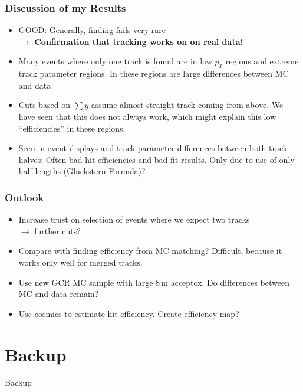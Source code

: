 \documentclass[18pt]{beamer}
\begin{document}
\begin{frame}
  \frametitle{Discussion of my Results}
  \begin{itemize}
  \item GOOD: Generally, finding fails very rare\\
    $\rightarrow$  \textbf{Confirmation that tracking works on on real data!}
  \item Many events where only one track is found are in low $p_T$ regions and extreme track parameter regions.
    In these regions are large differences between MC and data
  \item Cuts based on $\sum y$ assume almost straight track coming from above. We have seen that this does not always work, which might explain this low ``efficiencies'' in these regions.
  \item Seen in event displays and track parameter differences between both track halves:
    Often bad hit efficiencies and bad fit results. Only due to use of only half lengths (Glückstern Formula)?
  \end{itemize}
  
\end{frame}

\begin{frame}
  \frametitle{Outlook}\label{lastbeforebackup}
  \begin{itemize}
  \item Increase trust on selection of events where we expect two tracks
    \\$\rightarrow$ further cuts?
  \item Compare with finding efficiency from MC matching? Difficult, because it works only well for merged tracks.
  \item Use new GCR MC sample with large 8\,m acceptox. Do differences between MC and data remain?
  \item Use cosmics to estimate hit efficiency. Create efficiency map?
  \end{itemize}
\end{frame}

\section{Backup}

\begin{frame}
  \begin{center}
    \huge Backup
  \end{center}
\end{frame}
\end{document}
